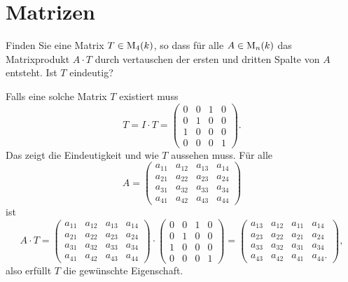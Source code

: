 \section{Matrizen}


\begin{question}
 Finden Sie eine Matrix $T \in \operatorname{M}_4(k)$, so dass für alle $A \in \operatorname{M}_n(k)$ das Matrixprodukt $A \cdot T$ durch vertauschen der ersten und dritten Spalte von $A$ entsteht. Ist $T$ eindeutig?
\end{question}
\begin{solution}
 Falls eine solche Matrix $T$ existiert muss
 \[
  T = I \cdot T =
  \begin{pmatrix}
   0 & 0 & 1 & 0 \\
   0 & 1 & 0 & 0 \\
   1 & 0 & 0 & 0 \\
   0 & 0 & 0 & 1
  \end{pmatrix}.
 \]
 Das zeigt die Eindeutigkeit und wie $T$ aussehen muss. Für alle
 \[
  A =
  \begin{pmatrix}
   a_{11} & a_{12} & a_{13} & a_{14} \\
   a_{21} & a_{22} & a_{23} & a_{24} \\
   a_{31} & a_{32} & a_{33} & a_{34} \\
   a_{41} & a_{42} & a_{43} & a_{44}
  \end{pmatrix}
 \]
 ist
 \[
  A \cdot T =
  \begin{pmatrix}
   a_{11} & a_{12} & a_{13} & a_{14} \\
   a_{21} & a_{22} & a_{23} & a_{24} \\
   a_{31} & a_{32} & a_{33} & a_{34} \\
   a_{41} & a_{42} & a_{43} & a_{44}
  \end{pmatrix}
  \cdot
  \begin{pmatrix}
   0 & 0 & 1 & 0 \\
   0 & 1 & 0 & 0 \\
   1 & 0 & 0 & 0 \\
   0 & 0 & 0 & 1
  \end{pmatrix}
  =
  \begin{pmatrix}
   a_{13} & a_{12} & a_{11} & a_{14} \\
   a_{23} & a_{22} & a_{21} & a_{24} \\ 
   a_{33} & a_{32} & a_{31} & a_{34} \\
   a_{43} & a_{42} & a_{41} & a_{44}.
  \end{pmatrix},
 \]
 also erfüllt $T$ die gewünschte Eigenschaft.
\end{solution}




